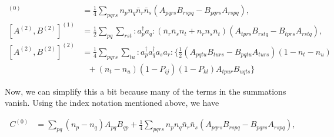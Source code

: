 \documentclass[12pt]{article}
\begin{document}
\begin{align}
[A^{(2)},B^{(2)}]^{(0)} &= \frac{1}{4} \sum_{pqrs} n_pn_q\bar{n}_r \bar{n}_s (A_{pqrs}B_{rspq}-B_{pqrs}A_{rspq}),\\
[A^{(2)},B^{(2)}]^{(1)} &= \frac{1}{2} \sum_{pq}\sum_{rst} :a_p^\dagger a_q: (\bar{n}_r \bar{n}_s n_t + n_r n_s \bar{n}_t) (A_{tprs}B_{rstq}-B_{tprs}A_{rstq}),\\
[A^{(2)},B^{(2)}]^{(2)} &= \frac{1}{4} \sum_{pqrs}\sum_{tu} :a_p^\dagger a_q^\dagger a_s a_r : \{ \frac{1}{2} (A_{pqtu}B_{turs}-B_{pqtu}A_{turs})(1-n_t-n_u)\\ &\ \ \ +  (n_t-n_u)(1-P_{ij})(1-P_{kl})A_{tpur}B_{uqts} \}
\end{align}

Now, we can simplify this a bit because many of the terms in the summations vanish. Using the index notation mentioned above, we have

\begin{align}
C^{(0)} &= \sum_{pq}(n_p-n_q)A_{pq}B_{qp} + \frac{1}{4} \sum_{pqrs} n_pn_q\bar{n}_r \bar{n}_s (A_{pqrs}B_{rspq}-B_{pqrs}A_{rspq}),
\end{align}
\end{document}
